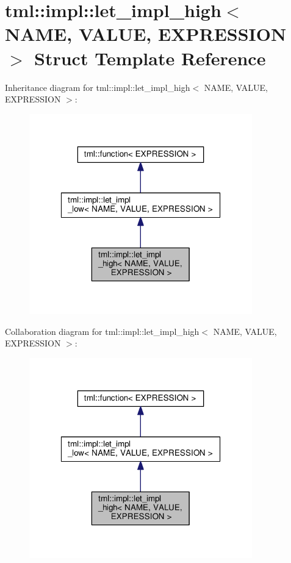 \hypertarget{structtml_1_1impl_1_1let__impl__high}{\section{tml\+:\+:impl\+:\+:let\+\_\+impl\+\_\+high$<$ N\+A\+M\+E, V\+A\+L\+U\+E, E\+X\+P\+R\+E\+S\+S\+I\+O\+N $>$ Struct Template Reference}
\label{structtml_1_1impl_1_1let__impl__high}
}


Inheritance diagram for tml\+:\+:impl\+:\+:let\+\_\+impl\+\_\+high$<$ N\+A\+M\+E, V\+A\+L\+U\+E, E\+X\+P\+R\+E\+S\+S\+I\+O\+N $>$\+:
\nopagebreak
\begin{figure}[H]
\begin{center}
\leavevmode
\includegraphics[width=274pt]{structtml_1_1impl_1_1let__impl__high__inherit__graph}
\end{center}
\end{figure}


Collaboration diagram for tml\+:\+:impl\+:\+:let\+\_\+impl\+\_\+high$<$ N\+A\+M\+E, V\+A\+L\+U\+E, E\+X\+P\+R\+E\+S\+S\+I\+O\+N $>$\+:
\nopagebreak
\begin{figure}[H]
\begin{center}
\leavevmode
\includegraphics[width=274pt]{structtml_1_1impl_1_1let__impl__high__coll__graph}
\end{center}
\end{figure}
